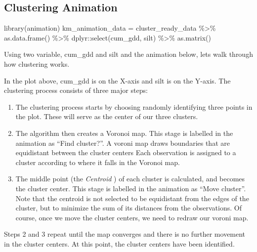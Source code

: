 \documentclass[
]{book}
\newenvironment{Shaded}{\begin{snugshade}}{\end{snugshade}}
\newcommand{\FunctionTok}[1]{\textcolor[rgb]{0.00,0.00,0.00}{#1}}
\newcommand{\NormalTok}[1]{#1}
\newcommand{\OtherTok}[1]{\textcolor[rgb]{0.56,0.35,0.01}{#1}}
\newcommand{\SpecialCharTok}[1]{\textcolor[rgb]{0.00,0.00,0.00}{#1}}
\begin{document}
\hypertarget{clustering-animation}{%
\subsection{Clustering Animation}\label{clustering-animation}}

\begin{Shaded}
\begin{Highlighting}[]
\FunctionTok{library}\NormalTok{(animation)}
\NormalTok{km\_animation\_data }\OtherTok{=}\NormalTok{ cluster\_ready\_data }\SpecialCharTok{\%\textgreater{}\%}
  \FunctionTok{as.data.frame}\NormalTok{() }\SpecialCharTok{\%\textgreater{}\%}
\NormalTok{  dplyr}\SpecialCharTok{::}\FunctionTok{select}\NormalTok{(cum\_gdd, silt) }\SpecialCharTok{\%\textgreater{}\%}
  \FunctionTok{as.matrix}\NormalTok{()}
\end{Highlighting}
\end{Shaded}

Using two variable, cum\_gdd and silt and the animation below, lets walk through how clustering works.

In the plot above, cum\_gdd is on the X-axis and silt is on the Y-axis. The clustering process consists of three major steps:

\begin{enumerate}
\def\labelenumi{\arabic{enumi})}
\item
  The clustering process starts by choosing randomly identifying three points in the plot. These will serve as the center of our three clusters.
\item
  The algorithm then creates a Voronoi map. This stage is labelled in the animation as ``Find cluster?''. A voroni map draws boundaries that are equidistant between the cluster centers Each observation is assigned to a cluster according to where it falls in the Voronoi map.
\item
  The middle point (the \emph{Centroid} ) of each cluster is calculated, and becomes the cluster center. This stage is labelled in the animation as ``Move cluster''. Note that the centroid is not selected to be equidistant from the edges of the cluster, but to minimize the sum of its distances from the observations. Of course, once we move the cluster centers, we need to redraw our voroni map.
\end{enumerate}

Steps 2 and 3 repeat until the map converges and there is no further movement in the cluster centers. At this point, the cluster centers have been identified.
\end{document}
